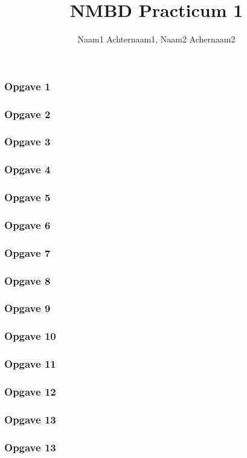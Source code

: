 \documentclass[a4paper,10pt,oneside]{article}
\title{ NMBD Practicum 1\versietitel}
\author{Naam1 Achternaam1, Naam2 Achernaam2} %
\begin{document}
\maketitle


\subsubsection*{Opgave 1}

\subsubsection*{Opgave 2}

\subsubsection*{Opgave 3}

\subsubsection*{Opgave 4}

\subsubsection*{Opgave 5}

\subsubsection*{Opgave 6}

\subsubsection*{Opgave 7}

\subsubsection*{Opgave 8}

\subsubsection*{Opgave 9}

\subsubsection*{Opgave 10}

\subsubsection*{Opgave 11}

\subsubsection*{Opgave 12}

\subsubsection*{Opgave 13}

\subsubsection*{Opgave 13}
\end{document}
